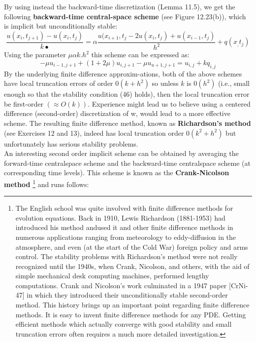 \documentclass[../main.tex]{subfiles}
\begin{document}
By using instead the backward-time discretization (Lemma 11.5), we get the following \textbf{backward-time central-space scheme} (see Figure 12.23(b)), which is implicit but unconditionally stable:
\begin{equation}\label{eqa47}
\dfrac{u(x_i,t_{j+1})-u(x_i,t_{j})}{k•}=\alpha 
 \dfrac{u(x_{i+1},t_{j}-2u(x_{i},t_{j})+u(x_{i-1},t_{j})}{h^2}+q(x_,t_j)
\end{equation}
Using the parameter $\mu \alpha k.h^2$ this scheme can be expressed as:
\begin{equation}\label{eqa48}
-\mu u_{i-1,j+1}+(1+2\mu)u_{i,j+1}-\mu u_{u+1,j+1}=u_{i,j}+kq_{i,j}
\end{equation}
By the underlying finite difference approxim-ations, both of the above schemes have local truncation errors of order $0(k + h^2)$ so unless $k$ is $0(h^2)$ (i.e., small enough so that the stability condition (46) holds), then the local truncation error  be first-order $( \approx O(k))$. Experience might lead us to believe using a centered  difference (second-order) discretization of w, would lead to a more effective scheme. The resulting finite difference method, known as \textbf{Richardson's method} (see Exercises 12 and 13), indeed has local truncation order $0(k^2+h^2)$ but unfortunately has serious stability problems. 
\\%
An interesting second order implicit scheme can be obtained by averaging the forward-time centralspace scheme and the backward-time centralspace scheme (at corresponding time levels). This scheme is known as the \textbf{Crank-Nicolson method}
\footnote{The English school was quite involved with finite difference methods for evolution equations. Back in 1910, Lewis Richardson (1881-1953) had introduced his method andused it and other finite difference methods in numerous applications ranging from meteorology to eddy-diffusion in the atmosphere, and even (at the start of the Cold War) foreign policy and arms control. The stability problems with Richardson's method were not really recognized until the 1940s, when Crank, Nicolson, and others, with the aid of simple mechanical desk computing machines, performed lengthy computations. Crank and Nicolson's work culminated in a 1947 paper [CrNi-47] in which they introduced their unconditionally stable second-order method. This history brings up an important point regarding finite difference methods. It is easy to invent finite difference methods for any PDE. Getting efficient methods which actually converge with good stability and small truncation errors often requires a much more detailed investigation.}
and runs follows:
\end{document}

